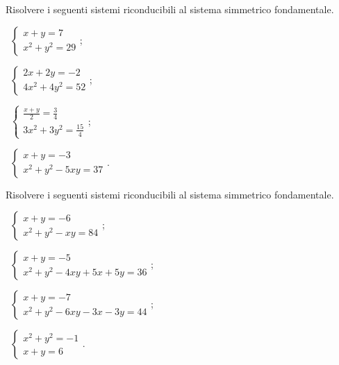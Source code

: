\begin{esercizio}[\Ast]
 \label{ese:6.22}
Risolvere i seguenti sistemi riconducibili al sistema simmetrico fondamentale.
\begin{multicols}{2}
 \begin{enumeratea}
 \item~$\left\{\begin{array}{l}x+y=7 \\x^2+y^2=29\end{array}\right.$;
 \item~$\left\{\begin{array}{l}2x+2y=-2\\4x^2+4y^2=52\end{array}\right.$;
 \item~$\left\{\begin{array}{l}\frac{x+y} 2=\frac 3 4\\3x^2+3y^2=\frac{15} 4\end{array}\right.$;
 \item~$\left\{\begin{array}{l}x+y=-3 \\x^2+y^2-5xy=37\end{array}\right.$.
 \end{enumeratea}
 \end{multicols}
\end{esercizio}

\begin{esercizio}[\Ast]
\label{ese:6.23}
Risolvere i seguenti sistemi riconducibili al sistema simmetrico fondamentale.
\begin{multicols}{2}
 \begin{enumeratea}
 \item~$\left\{\begin{array}{l}x+y=-6 \\x^2+y^2-xy=84\end{array}\right.$;
 \item~$\left\{\begin{array}{l}x+y=-5 \\x^2+y^2-4xy+5x+5y=36\end{array}\right.$;
 \item~$\left\{\begin{array}{l}x+y=-7 \\x^2+y^2-6xy-3x-3y=44\end{array}\right.$;
 \item~$\left\{\begin{array}{l}x^2+y^2=-1\\x+y=6 \end{array}\right.$.
 \end{enumeratea}
 \end{multicols}
\end{esercizio}

